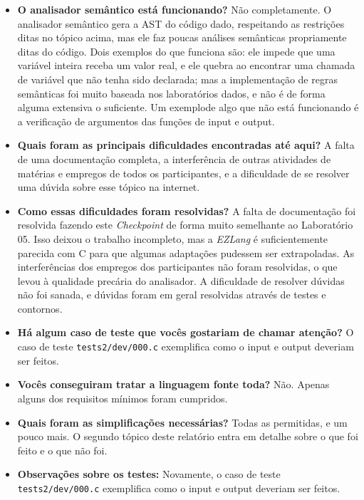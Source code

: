 \documentclass[a4paper] {article}
\begin{document}
\begin{itemize}
\begin{itemize}
	\end{itemize}
	\item \textbf{O analisador semântico está funcionando?} Não completamente. O analisador semântico gera a AST do código dado, respeitando as restrições ditas no tópico acima, mas ele faz poucas análises semânticas propriamente ditas do código. Dois exemplos do que funciona são: ele impede que uma variável inteira receba um valor real, e ele quebra ao encontrar uma chamada de variável que não tenha sido declarada; mas a implementação de regras semânticas foi muito baseada nos laboratórios dados, e não é de forma alguma extensiva o suficiente. Um exemplode algo que não está funcionando é a verificação de argumentos das funções de input e output.
	\item \textbf{Quais foram as principais dificuldades encontradas at\'{e} aqui?} A falta de uma documentação completa, a interferência de outras atividades de matérias e empregos de todos os participantes, e a dificuldade de se resolver uma dúvida sobre esse tópico na internet.
	\item \textbf{Como essas dificuldades foram resolvidas?} A falta de documentação foi resolvida fazendo este \textit{Checkpoint} de forma muito semelhante ao Laboratório 05. Isso deixou o trabalho incompleto, mas a \textit{EZLang} é suficientemente parecida com C para que algumas adaptações pudessem ser extrapoladas. As interferências dos empregos dos participantes não foram resolvidas, o que levou à qualidade precária do analisador. A dificuldade de resolver dúvidas não foi sanada, e dúvidas foram em geral resolvidas através de testes e contornos.
	\item \textbf{H\'{a} algum caso de teste que voc\^{e}s gostariam de chamar aten\c{c}\~{a}o?} O caso de teste \texttt{tests2/dev/000.c} exemplifica como o input e output deveriam ser feitos.
	\item \textbf{Voc\^{e}s conseguiram tratar a linguagem fonte toda?} Não. Apenas alguns dos requisitos mínimos foram cumpridos.
	\item \textbf{Quais foram as simplifica\c{c}\~{o}es necess\'{a}rias?} Todas as permitidas, e um pouco mais. O segundo tópico deste relatório entra em detalhe sobre o que foi feito e o que não foi.
	\item \textbf{Observa\c{c}\~{o}es sobre os testes:} Novamente, o caso de teste \texttt{tests2/dev/000.c} exemplifica como o input e output deveriam ser feitos.
\end{itemize}
\end{document}
